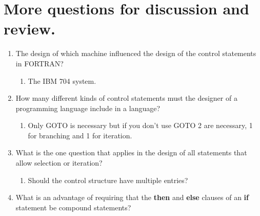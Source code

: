 












\section{More questions for discussion and review.}

\begin{enumerate}
  \item The design of which machine influenced the design
    of the control statements in FORTRAN?

    \begin{answer}

    \begin{enumerate}
    \item The IBM 704 system.
    \end{enumerate}

    \end{answer}


  \item How many different kinds of control statements
    must the designer of a programming language include
    in a language?

    \begin{answer}

    \begin{enumerate}
    \item Only GOTO is necessary but if you don't use GOTO 
      2 are necessary, 1 for branching and 1 for iteration.
    \end{enumerate}

    \end{answer}

  \item What is the one question that applies in the
    design of all statements that allow selection or
    iteration?
    \begin{answer}

    \begin{enumerate}
    \item Should the control structure have multiple entries?
    \end{enumerate}

    \end{answer}

  \item What is an advantage of requiring that
    the \textbf{then} and \textbf{else} clauses of
    an \textbf{if} statement be compound statements?


\end{enumerate}
